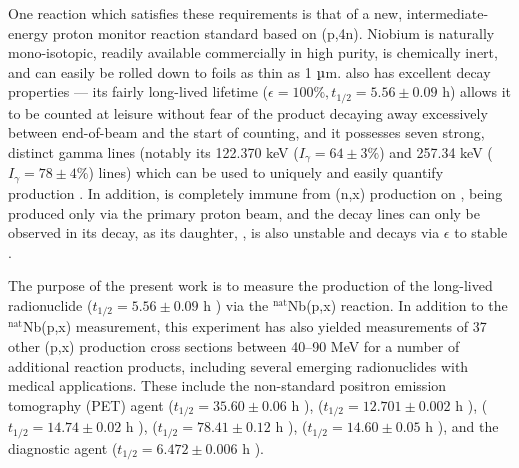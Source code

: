 \documentclass[%
 reprint,
superscriptaddress,
onecolumn,
linenumbers,
notitlepage,
 amsmath,amssymb,
 aps,
prc,
]{revtex4-1}
\newcommand{\comment}[1]{\todo[color=blue!20!white,inline]{ASV: #1}}
\begin{document}
One  reaction which satisfies these requirements is that of a new, intermediate-energy proton monitor reaction standard based on (p,4n). 
Niobium is naturally mono-isotopic, readily  available commercially in high purity, is chemically inert, and can easily be rolled down to foils as thin as 1 $\micro$m.  
 also has excellent decay properties --- its fairly long-lived lifetime ($\epsilon=100\%, t_{1/2}=5.56 \pm 0.09$ h) allows it to be counted at leisure without fear of the product  decaying away excessively between end-of-beam and the start of counting, and it possesses seven strong, distinct gamma lines (notably its 122.370 keV ($I_\gamma = 64 \pm 3\%$) and 257.34 keV ($I_\gamma = 78 \pm 4\%$) lines) which can be used to uniquely and easily   quantify  production \cite{Browne1997}. 
In addition,   is completely immune from (n,x) production on  , being produced only via the primary proton beam, and the  decay lines can only be observed in its decay, as its daughter, , is also unstable and decays via $\epsilon$ to stable . 
 
The purpose of the present work is to  measure the production of the long-lived radionuclide  ($t_{1/2}=5.56 \pm 0.09$ h \cite{Browne1997}) via the $^\text{nat}$Nb(p,x) reaction. 
In addition to the $^\text{nat}$Nb(p,x) measurement, this experiment has also yielded measurements of 37 other (p,x) production cross sections between 40--90 MeV  for a number of additional reaction products, including several emerging radionuclides with medical applications.
These include the non-standard positron emission tomography (PET) agent   ($t_{1/2}=35.60\pm0.06$ h \cite{Bhat1998}),  ($t_{1/2}=12.701 \pm 0.002$ h \cite{Singh2007}),   ($t_{1/2}=14.74\pm0.02$ h \cite{NEGRET20151}),  ($t_{1/2}=78.41\pm0.12$ h \cite{Singh2013}),   ($t_{1/2}=14.60 \pm 0.05$ h \cite{Browne1997}),  and the diagnostic agent  ($t_{1/2}=6.472\pm0.006$ h \cite{Tuli2003}). 


%   
\end{document}
